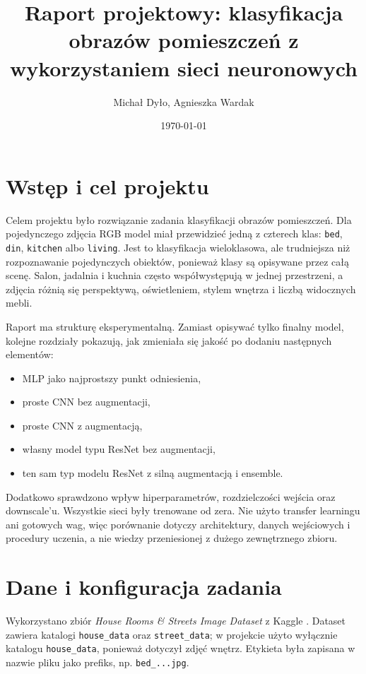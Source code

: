 \documentclass[12pt,a4paper]{article}
\title{Raport projektowy: klasyfikacja obrazów pomieszczeń z wykorzystaniem sieci neuronowych}
\author{Michał Dyło, Agnieszka Wardak}
\date{\today}
\begin{document}
\maketitle
\newpage
\tableofcontents
\newpage

\section{Wstęp i cel projektu}

Celem projektu było rozwiązanie zadania klasyfikacji obrazów pomieszczeń. Dla pojedynczego zdjęcia RGB model miał przewidzieć jedną z czterech klas: \texttt{bed}, \texttt{din}, \texttt{kitchen} albo \texttt{living}. Jest to klasyfikacja wieloklasowa, ale trudniejsza niż rozpoznawanie pojedynczych obiektów, ponieważ klasy są opisywane przez całą scenę. Salon, jadalnia i kuchnia często współwystępują w jednej przestrzeni, a zdjęcia różnią się perspektywą, oświetleniem, stylem wnętrza i liczbą widocznych mebli.

Raport ma strukturę eksperymentalną. Zamiast opisywać tylko finalny model, kolejne rozdziały pokazują, jak zmieniała się jakość po dodaniu następnych elementów:
\begin{itemize}
  \item MLP jako najprostszy punkt odniesienia,
  \item proste CNN bez augmentacji,
  \item proste CNN z augmentacją,
  \item własny model typu ResNet bez augmentacji,
  \item ten sam typ modelu ResNet z silną augmentacją i ensemble.
\end{itemize}

Dodatkowo sprawdzono wpływ hiperparametrów, rozdzielczości wejścia oraz downscale'u. Wszystkie sieci były trenowane od zera. Nie użyto transfer learningu ani gotowych wag, więc porównanie dotyczy architektury, danych wejściowych i procedury uczenia, a nie wiedzy przeniesionej z dużego zewnętrznego zbioru.

\section{Dane i konfiguracja zadania}

Wykorzystano zbiór \textit{House Rooms \& Streets Image Dataset} z Kaggle \cite{kaggle_dataset}. Dataset zawiera katalogi \texttt{house\_data} oraz \texttt{street\_data}; w projekcie użyto wyłącznie katalogu \texttt{house\_data}, ponieważ dotyczył zdjęć wnętrz. Etykieta była zapisana w nazwie pliku jako prefiks, np. \texttt{bed\_...jpg}.
\end{document}
